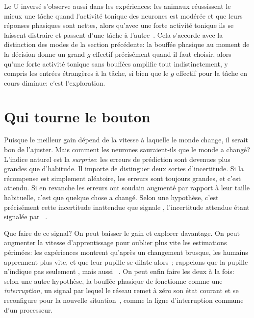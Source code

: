 Le U inversé s'observe aussi dans les expériences: les animaux réussissent le mieux une tâche quand l'activité tonique des neurones  est modérée et que leurs réponses phasiques sont nettes, alors qu'avec une forte activité tonique ils se laissent distraire et passent d'une tâche à l'autre~\cite{AstonJones2005}. Cela s'accorde avec la distinction des modes de la section précédente: la bouffée phasique au moment de la décision donne un grand $g$ effectif précisément quand il faut choisir, alors qu'une forte activité tonique sans bouffées amplifie tout indistinctement, y compris les entrées étrangères à la tâche, si bien que le $g$ effectif pour la tâche en cours diminue: c'est l'exploration.

\section{Qui tourne le bouton}

Puisque le meilleur gain dépend de la vitesse à laquelle le monde change, il serait bon de l'ajuster. Mais comment les neurones  sauraient-ils que le monde a changé? L'indice naturel est la \emph{surprise}: les erreurs de prédiction sont devenues plus grandes que d'habitude. Il importe de distinguer deux sortes d'incertitude. Si la récompense est simplement aléatoire, les erreurs sont toujours grandes, et c'est attendu. Si en revanche les erreurs ont soudain augmenté par rapport à leur taille habituelle, c'est que quelque chose a changé. Selon une hypothèse, c'est précisément cette incertitude inattendue que signale , l'incertitude attendue étant signalée par ~\cite{YuDayan2005}.

Que faire de ce signal? On peut baisser le gain et explorer davantage. On peut augmenter la vitesse d'apprentissage pour oublier plus vite les estimations périmées: les expériences montrent qu'après un changement brusque, les humains apprennent plus vite, et que leur pupille se dilate alors~\cite{Nassar2012}; rappelons que la pupille n'indique pas seulement , mais aussi ~\cite{Reimer2016}. On peut enfin faire les deux à la fois: selon une autre hypothèse, la bouffée phasique de  fonctionne comme une \emph{interruption}, un signal par lequel le réseau remet à zéro son état courant et se reconfigure pour la nouvelle situation~\cite{BouretSara2005}, comme la ligne d'interruption commune d'un processeur.

